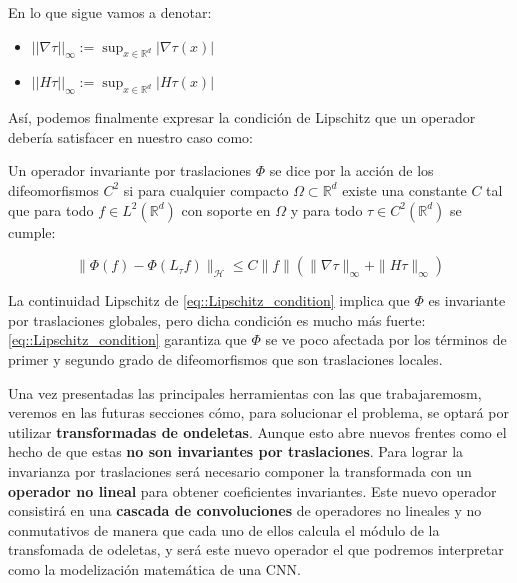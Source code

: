 \medskip


\noindent En lo que sigue vamos a denotar: 

\begin{itemize}
  \item $||\nabla \tau ||_\infty := \sup_{x \in \mathbb{R}^d} |\nabla \tau(x)|$
  \item $||H \tau ||_\infty := \sup_{x \in \mathbb{R}^d} |H \tau(x)|$ 
\end{itemize}

\medskip

\noindent Así, podemos finalmente expresar la condición de Lipschitz que un operador debería satisfacer en nuestro caso como: 


\medskip

\begin{definicion} \label{def::Lipschitz_cont}
\noindent Un operador invariante por traslaciones $\Phi$ se dice  por la acción de los difeomorfismos $C^2$  si para cualquier compacto $\Omega \subset \mathbb{R}^d$ existe una constante $C$ tal que para todo $f \in L^2(\mathbb{R}^d)$ con soporte en $\Omega$ y para todo $\tau \in C^2(\mathbb{R}^d)$ se cumple:

\begin{equation} \label{eq::Lipschitz_condition}
  \| \Phi(f)-\Phi(L_{\tau}f)\|_\mathcal{H} \leq C\|f\|(\|\nabla\tau\|_{\infty} + \|H \tau\|_\infty)
\end{equation}
\end{definicion}

\medskip

\noindent La continuidad Lipschitz de \eqref{eq::Lipschitz_condition} implica que $\Phi$ es invariante por traslaciones globales, pero dicha condición es mucho más fuerte: \eqref{eq::Lipschitz_condition} garantiza que $\Phi$ se ve poco afectada por los términos de primer y segundo grado de difeomorfismos que son traslaciones locales.

\medskip


\noindent Una vez presentadas las principales herramientas con las que trabajaremosm, veremos en las futuras secciones cómo, para solucionar el problema, se optará por utilizar \textbf{transformadas de ondeletas}. Aunque esto abre nuevos frentes como el hecho de que estas \textbf{no son invariantes por traslaciones}. Para lograr la invarianza por traslaciones será necesario componer la transformada con un \textbf{operador no lineal} para obtener coeficientes invariantes. Este nuevo operador consistirá en una \textbf{cascada de convoluciones} de operadores no lineales y no conmutativos de manera que cada uno de ellos calcula el módulo de la transfomada de odeletas, y será este nuevo operador el que podremos interpretar como la modelización matemática de una CNN.


\endinput
